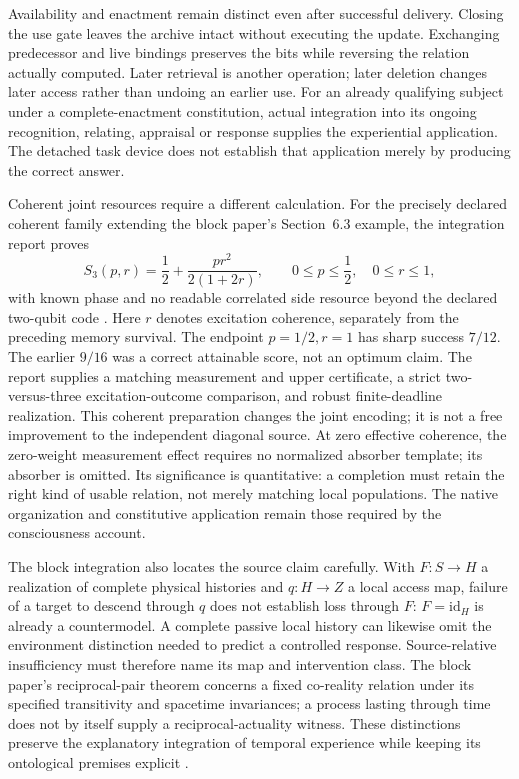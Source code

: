 Availability and enactment remain distinct even after successful delivery. Closing the use gate leaves the archive intact without executing the update. Exchanging predecessor and live bindings preserves the bits while reversing the relation actually computed. Later retrieval is another operation; later deletion changes later access rather than undoing an earlier use. For an already qualifying subject under a complete-enactment constitution, actual integration into its ongoing recognition, relating, appraisal or response supplies the experiential application. The detached task device does not establish that application merely by producing the correct answer.

Coherent joint resources require a different calculation. For the precisely declared coherent family extending the block paper's Section~6.3 example, the integration report proves
\[
S_3(p,r)=\frac12+\frac{pr^2}{2(1+2r)},\qquad
0\le p\le\frac12,\quad0\le r\le1,
\]
with known phase and no readable correlated side resource beyond the declared two-qubit code \cite{RodgersIntegration2026}. Here $r$ denotes excitation coherence, separately from the preceding memory survival. The endpoint $p=1/2,r=1$ has sharp success $7/12$. The earlier $9/16$ was a correct attainable score, not an optimum claim. The report supplies a matching measurement and upper certificate, a strict two-versus-three excitation-outcome comparison, and robust finite-deadline realization. This coherent preparation changes the joint encoding; it is not a free improvement to the independent diagonal source. At zero effective coherence, the zero-weight measurement effect requires no normalized absorber template; its absorber is omitted. Its significance is quantitative: a completion must retain the right kind of usable relation, not merely matching local populations. The native organization and constitutive application remain those required by the consciousness account.


The block integration also locates the source claim carefully. With $F:S\to H$ a realization of complete physical histories and $q:H\to Z$ a local access map, failure of a target to descend through $q$ does not establish loss through $F$: $F=\mathrm{id}_H$ is already a countermodel. A complete passive local history can likewise omit the environment distinction needed to predict a controlled response. Source-relative insufficiency must therefore name its map and intervention class. The block paper's reciprocal-pair theorem concerns a fixed co-reality relation under its specified transitivity and spacetime invariances; a process lasting through time does not by itself supply a reciprocal-actuality witness. These distinctions preserve the explanatory integration of temporal experience while keeping its ontological premises explicit \cite{RodgersBlock2026}.

